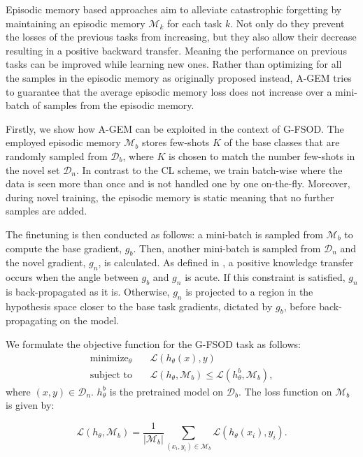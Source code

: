 \documentclass[10pt,twocolumn,letterpaper]{article}
\begin{document}
Episodic memory based approaches \cite{gem, agem, MER, gss} aim to alleviate catastrophic forgetting by maintaining an episodic memory $\mathcal{M}_k$ for each task $k$. Not only do they prevent the losses of the previous tasks from increasing, but they also allow their decrease resulting in a positive backward transfer. Meaning the performance on previous tasks can be improved while learning new ones. Rather than optimizing for all the samples in the episodic memory as originally proposed \cite{gem} instead, A-GEM \cite{agem} tries to guarantee that the average episodic memory loss does not increase over a mini-batch of samples from the episodic memory. 

Firstly, we show how A-GEM \cite{agem} can be exploited in the context of G-FSOD. The employed episodic memory $\mathcal{M}_{b}$ stores few-shots $K$ of the base classes that are randomly sampled from $\mathcal{D}_b$, where $K$ is chosen to match the number few-shots in the novel set $\mathcal{D}_n$. In contrast to the CL scheme, we train batch-wise where the data is seen more than once and is not handled one by one on-the-fly. Moreover, during novel training, the episodic memory is static meaning that no further samples are added. 

The finetuning is then conducted as follows: a mini-batch is sampled from $\mathcal{M}_{b}$ to compute the base gradient, $g_b$. Then, another mini-batch is sampled from $\mathcal{D}_n$ and the novel gradient, $g_n$, is calculated. As defined in \cite{gem, agem}, a positive knowledge transfer occurs when the angle between $g_b$ and $g_n$ is acute. If this constraint is satisfied, $g_n$ is back-propagated as it is. Otherwise, $g_n$ is projected to a region in the hypothesis space closer to the base task gradients, dictated by $g_b$, before back-propagating on the model. 

We formulate the objective function for the G-FSOD task as follows:  
\begin{align}
\text{minimize}_\theta\quad& \mathcal{L}(h_\theta(x), y)\nonumber\\
\text{subject to}\quad& \mathcal{L}(h_\theta,  \mathcal{M}_{b}) \leq
\mathcal{L}(h^{b}_{\theta},  \mathcal{M}_{b}),
\label{eq:projgrad-batch}
\end{align}
where $(x, y) \in \mathcal{D}_n$. $h^{b}_{\theta}$ is the pretrained model on $\mathcal{D}_b$. The loss function on $\mathcal{M}_{b}$ is given by:

\begin{equation}
\label{eq:previous_task_loss}
    \mathcal{L}(h_{\theta}, \mathcal{M}_b) = \frac{1}{\left| \mathcal{M}_b \right|} \sum_{(x_i,y_i)\in \mathcal{M}_b} \mathcal{L}(h_{\theta}(x_i), y_i).
\end{equation}
\end{document}

